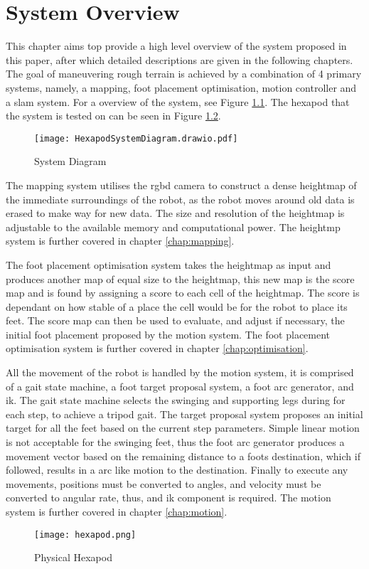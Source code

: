 \chapter{System Overview}
This chapter aims top provide a high level overview of the system proposed in this paper, after which detailed descriptions are given
in the following chapters. The goal of maneuvering rough terrain is achieved by a combination of 4 primary systems, namely, a mapping, foot placement optimisation, motion controller and a \ac*{slam} system.
For a overview of the system, see Figure \ref{fig:system_diagram}. The hexapod that the system is tested on can be seen in Figure \ref{fig:hexapod}.

\begin{figure}[h]
    \centering
    \texttt{[image: HexapodSystemDiagram.drawio.pdf]}
    \caption{System Diagram}
    \label{fig:system_diagram}
\end{figure}

\noindent
The mapping system utilises the \ac*{rgbd} camera to construct a dense heightmap of the immediate surroundings of the robot, as the robot moves around old data is erased to make
way for new data. The size and resolution of the heightmap is adjustable to the available memory and computational power. The heightmp system is further covered in chapter \ref{chap:mapping}.

The foot placement optimisation system takes the heightmap as input and produces another map of equal size to the heightmap, this new map is the score map and is found by assigning a score to each
cell of the heightmap. The score is dependant on how stable of a place the cell would be for the robot to place its feet. The score map can then be used to evaluate, and adjust if necessary, the
initial foot placement proposed by the motion system. The foot placement optimisation system is further covered in chapter \ref{chap:optimisation}.

All the movement of the robot is handled by the motion system, it is comprised of a gait state machine, a foot target proposal system, a foot arc generator, and \ac{ik}.
The gait state machine selects the swinging and supporting legs during for each step, to achieve a tripod gait. The target proposal system proposes an initial target for all the feet based
on the current step parameters. Simple linear motion is not acceptable for the swinging feet, thus the foot arc generator produces a movement vector based on the remaining distance to a foots destination,
which if followed, results in a arc like motion to the destination. Finally to execute any movements, positions must be converted to angles, and velocity must be converted to
angular rate, thus, and \ac{ik} component is required. The motion system is further covered in chapter \ref{chap:motion}.

\begin{figure}[h]
    \centering
    \texttt{[image: hexapod.png]}
    \caption{Physical Hexapod}
    \label{fig:hexapod}
\end{figure}
